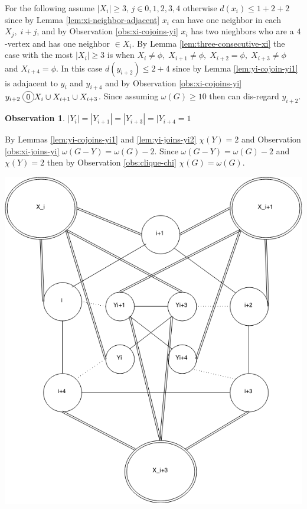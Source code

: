 \documentclass[12pt]{article}
\newcommand*\circled[1]{\tikz[baseline=(char.base)]{
            \node[shape=circle,draw,inner sep=2pt] (char) {#1};}}
\newtheorem{Observation}[Theorem]{Observation}
\begin{document}
For the following assume $|X_i| \geq 3,\, j \in {0,1,2,3,4}$ otherwise $d(x_i) \leq 1 + 2 + 2$ since by Lemma \ref{lem:xi-neighbor-adjacent} $x_i$ can have one neighbor in each $X_j,\; i+j$, and by Observation \ref{obs:xi-cojoins-yi} $x_i$ has two nieghbors who are a $4$-vertex and has one neighbor $\in X_i$. By Lemma \ref{lem:three-consecutive-xi} the case with the most $|X_i| \geq 3$ is when $X_i \neq \phi,\; X_{i+1} \neq \phi,\; X_{i+2} = \phi,\; X_{i+3} \neq \phi$ and $X_{i+4} = \phi$. In this case $d(y_{i+2}) \leq 2 + 4$ since by Lemma \ref{lem:yi-cojoin-yi1} is adajacent to $y_{i}$ and $y_{i+4}$ and by Observation \ref{obs:xi-cojoins-yi} $y_{i+2} \; \circled{0} X_i \cup X_{i+1} \cup X_{i+3}$. Since assuming $\omega (G) \geq 10$ then can dis-regard $y_{i+2}$.

\begin{Observation}\label{obs:four-yi} 
$|Y_i| = |Y_{i+1}| = |Y_{i+3}| = |Y_{i+4} =  1$
\end{Observation}
\begin{minipage}{0.5\textwidth}%
	 By Lemmas \ref{lem:yi-cojoins-yi1} and \ref{lem:yi-joins-yi2} $\chi (Y) = 2$ and Observation \ref{obs:xi-joins-yi} $\omega(G - Y) = \omega(G) - 2$. Since $\omega(G - Y) = \omega(G) - 2 $ and $\chi(Y) = 2$ then by Observation \ref{obs:clique-chi} $\chi(G) = \omega(G)$.
\end{minipage}
\hfill
\begin{minipage}{0.5\textwidth}\raggedleft
	\includegraphics[width=\linewidth]{Base.png}
\end{minipage}
\end{document}
